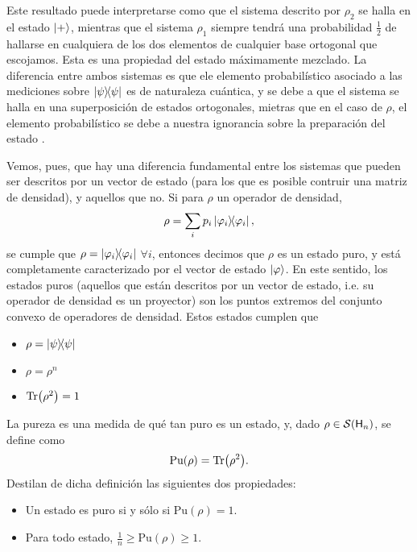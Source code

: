 Este resultado puede interpretarse como que el sistema descrito por $\rho_{2}$ se halla en el estado $\ket{+}$, mientras que el sistema $\rho_{1}$ siempre tendrá una probabilidad $\frac{1}{2}$ de hallarse en cualquiera de los dos elementos de cualquier base ortogonal que escojamos. Esta es una propiedad del estado máximamente mezclado. La diferencia entre ambos sistemas es que ele elemento probabilístico asociado a las mediciones sobre $\dyad{\psi}$ es de naturaleza cuántica, y se debe a que el sistema se halla en una superposición de estados ortogonales, mietras que en el caso de $\rho$, el elemento probabilístico se debe a nuestra ignorancia sobre la preparación del estado \cite{Chuang}.

Vemos, pues, que hay una diferencia fundamental entre los sistemas que pueden ser descritos por un vector de estado (para los que es posible contruir una matriz de densidad), y aquellos que no. Si para $\rho$ un operador de densidad,
\begin{equation*}
    \rho=\sum_{i}p_{i}\dyad{\varphi_{i}},
\end{equation*}
se cumple que $\rho=\dyad{\varphi_{i}}$ $\forall i$, entonces decimos que $\rho$ es un estado puro, y está completamente caracterizado por el vector de estado $\ket{\varphi}$. En este sentido, los estados puros (aquellos que están descritos por un vector de estado, i.e. su operador de densidad es un proyector) son los puntos extremos del conjunto convexo de operadores de densidad. Estos estados cumplen que
\begin{itemize}
    \item $\rho=\dyad{\psi}$
    \item $\rho=\rho^{n}$
    \item $\Tr(\rho^{2})=1$
\end{itemize}
La pureza es una medida de qué tan puro es un estado, y, dado $\rho\in\mathcal{S}({\sf H}_{n})$, se define como \cite{Jaeger}
\begin{equation*}
    \text{Pu}(\rho)=\Tr(\rho^{2}).
\end{equation*}
Destilan de dicha definición las siguientes dos propiedades:
\begin{itemize}
    \item Un estado es puro si y sólo si $\text{Pu}(\rho)=1$.
    \item Para todo estado, $\frac{1}{n}\geq \text{Pu}(\rho)\geq 1$.
\end{itemize}
